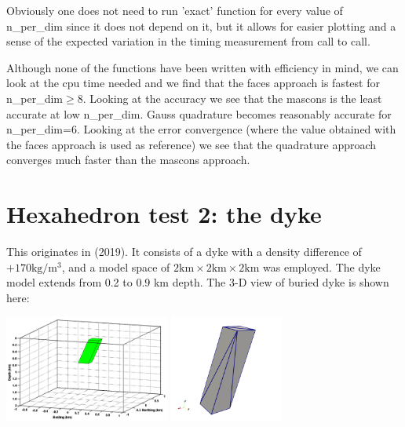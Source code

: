 Obviously one does not need to run 'exact' function for every value of {\python n\_per\_dim}
since it does not depend on it, but it allows for easier plotting and a sense of the 
expected variation in the timing measurement from call to call. 

Although none of the functions have been written with efficiency in mind, 
we can look at the cpu time needed and we find that the {\python faces}
approach is fastest for {\python n\_per\_dim}$\ge 8$.
Looking at the accuracy we see that the mascons is the least accurate at low 
{\python n\_per\_dim}. Gauss quadrature becomes reasonably accurate for 
{\python n\_per\_dim}=6. 
Looking at the error convergence (where the value obtained with the faces approach is used 
as reference) we see that the quadrature approach converges much faster than the mascons approach.


\section*{Hexahedron test 2: the dyke}

This originates in \textcite{uwms19} (2019). 
It consists of a dyke with a density difference 
of $+170 \si{\kg\per\cubic\meter}$, and a model space of 
$2\si{\km} \times  2 \si{\km} \times 2 \si{\km}$  was employed. 
The dyke model extends from 0.2 to 0.9 km depth. The 3-D view of buried dyke is shown here:

\begin{center}
\includegraphics[height=3.5cm]{python_codes/fieldstone_113/images/uwms19_a}
\includegraphics[height=3.5cm]{python_codes/fieldstone_113/images/dyke}
\end{center}

